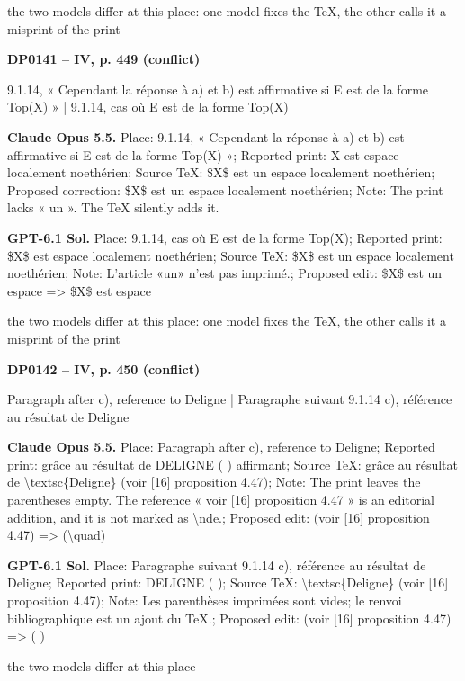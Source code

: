 the two models differ at this place: one model fixes the TeX, the other calls it a misprint of the print\par
\par\noindent\hypertarget{DP0141}{}\textbf{DP0141 -- IV, p. 449 (conflict)}\par
9.1.14, « Cependant la réponse à a) et b) est affirmative si E est de la forme Top(X) » | 9.1.14, cas où E est de la forme Top(X)\par
\textbf{Claude Opus 5.5.} Place: 9.1.14, « Cependant la réponse à a) et b) est affirmative si E est de la forme Top(X) »; Reported print: X est espace localement noethérien; Source TeX: \$X\$ est un espace localement noethérien; Proposed correction: \$X\$ est un espace localement noethérien; Note: The print lacks « un ». The TeX silently adds it.\par
\textbf{GPT-6.1 Sol.} Place: 9.1.14, cas où E est de la forme Top(X); Reported print: \$X\$ est espace localement noethérien; Source TeX: \$X\$ est un espace localement noethérien; Note: L'article «un» n'est pas imprimé.; Proposed edit: \$X\$ est un espace =\allowbreak > \$X\$ est espace\par
the two models differ at this place: one model fixes the TeX, the other calls it a misprint of the print\par
\par\noindent\hypertarget{DP0142}{}\textbf{DP0142 -- IV, p. 450 (conflict)}\par
Paragraph after c), reference to Deligne | Paragraphe suivant 9.1.14 c), référence au résultat de Deligne\par
\textbf{Claude Opus 5.5.} Place: Paragraph after c), reference to Deligne; Reported print: grâce au résultat de DELIGNE (     ) affirmant; Source TeX: grâce au résultat de \textbackslash{}textsc\{Deligne\} (voir [16] proposition 4.47); Note: The print leaves the parentheses empty. The reference « voir [16] proposition 4.47 » is an editorial addition, and it is not marked as \textbackslash{}nde.; Proposed edit: (voir [16] proposition 4.47) =\allowbreak > (\textbackslash{}quad)\par
\textbf{GPT-6.1 Sol.} Place: Paragraphe suivant 9.1.14 c), référence au résultat de Deligne; Reported print: DELIGNE ( ); Source TeX: \textbackslash{}textsc\{Deligne\} (voir [16] proposition 4.47); Note: Les parenthèses imprimées sont vides; le renvoi bibliographique est un ajout du TeX.; Proposed edit: (voir [16] proposition 4.47) =\allowbreak > ( )\par
the two models differ at this place\par

